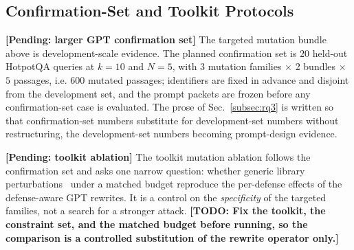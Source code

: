 \documentclass[conference]{IEEEtran}
\newcommand{\PENDING}[1]{\textbf{[Pending: #1]}}
\newcommand{\TODO}[1]{\textbf{[TODO: #1]}}
\newcommand{\NconfQ}{20}         %
\newcommand{\NconfPassages}{600} %
\newcommand{\Npoison}{5}         %
\newcommand{\Ktop}{10}           %
\begin{document}
\subsection{Confirmation-Set and Toolkit Protocols}
\label{subsec:confirmation}
\PENDING{larger GPT confirmation set}
The targeted mutation bundle above is development-scale evidence. The planned
confirmation set is $\NconfQ$ held-out HotpotQA queries at $k=\Ktop$ and
$N=\Npoison$, with 3 mutation families $\times$ 2 bundles $\times$ $\Npoison$
passages, i.e. $\NconfPassages$ mutated passages; identifiers are fixed in
advance and disjoint from the development set, and the prompt packets are frozen
before any confirmation-set case is evaluated. The prose of
Sec.~\ref{subsec:rq3} is written so that confirmation-set numbers substitute for
development-set numbers without restructuring, the development-set numbers
becoming prompt-design evidence.


\PENDING{toolkit ablation}
\label{subsec:toolkit}
The toolkit mutation ablation follows the confirmation set and asks one narrow
question: whether generic library
perturbations~\cite{jin2020textfooler,li2020bertattack,morris2020textattack}
under a matched budget reproduce the per-defense effects of the defense-aware GPT
rewrites. It is a control on the \emph{specificity} of the targeted families, not
a search for a stronger attack.
\TODO{Fix the toolkit, the constraint set, and the matched budget before running,
so the comparison is a controlled substitution of the rewrite operator only.}

\end{document}
